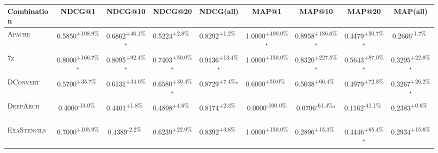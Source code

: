 \begin{table}[htbp]
\centering
\renewcommand{\arraystretch}{1.2}
\begin{tabular}{l|cccc|cccc}
\hline
Combination & NDCG@1 & NDCG@10 & NDCG@20 & NDCG(all) & MAP@1 & MAP@10 & MAP@20 & MAP(all) \\ \hline
\textsc{Apache} & \cellcolor{green!30}0.5850\textsuperscript{+108.9\%}$^{\,\,\,}$ & \cellcolor{green!30}0.6862\textsuperscript{+46.1\%}$^\star$ & \cellcolor{green!30}0.5224\textsuperscript{+2.8\%}$^{\,\,\,}$ & \cellcolor{green!30}0.8292\textsuperscript{+1.2\%}$^{\,\,\,}$ & \cellcolor{green!30}1.0000\textsuperscript{+400.0\%}$^\star$ & \cellcolor{green!30}0.8958\textsuperscript{+186.6\%}$^\star$ & \cellcolor{green!30}0.4479\textsuperscript{+50.7\%}$^\star$ & \cellcolor{red!30}0.2666\textsuperscript{-1.7\%}$^{\,\,\,}$ \\
\textsc{7z} & \cellcolor{green!30}0.8000\textsuperscript{+166.7\%}$^\star$ & \cellcolor{green!30}0.8095\textsuperscript{+92.4\%}$^\star$ & \cellcolor{green!30}0.7403\textsuperscript{+50.0\%}$^\star$ & \cellcolor{green!30}0.9136\textsuperscript{+13.4\%}$^\star$ & \cellcolor{green!30}1.0000\textsuperscript{+150.0\%}$^{\,\,\,}$ & \cellcolor{green!30}0.8320\textsuperscript{+227.5\%}$^\star$ & \cellcolor{green!30}0.5643\textsuperscript{+87.0\%}$^\star$ & \cellcolor{green!30}0.3295\textsuperscript{+22.8\%}$^\star$ \\
\textsc{DConvert} & \cellcolor{green!30}0.5700\textsuperscript{+35.7\%}$^{\,\,\,}$ & \cellcolor{green!30}0.6131\textsuperscript{+34.0\%}$^{\,\,\,}$ & \cellcolor{green!30}0.6580\textsuperscript{+30.4\%}$^\star$ & \cellcolor{green!30}0.8729\textsuperscript{+7.4\%}$^\star$ & \cellcolor{green!30}0.6000\textsuperscript{+50.0\%}$^{\,\,\,}$ & \cellcolor{green!30}0.5038\textsuperscript{+66.4\%}$^{\,\,\,}$ & \cellcolor{green!30}0.4979\textsuperscript{+72.8\%}$^{\,\,\,}$ & \cellcolor{green!30}0.3267\textsuperscript{+26.2\%}$^\star$ \\
\textsc{DeepArch} & \cellcolor{red!30}0.4000\textsuperscript{-13.0\%}$^{\,\,\,}$ & \cellcolor{green!30}0.4401\textsuperscript{+1.8\%}$^{\,\,\,}$ & \cellcolor{green!30}0.4898\textsuperscript{+4.6\%}$^{\,\,\,}$ & \cellcolor{green!30}0.8174\textsuperscript{+2.3\%}$^{\,\,\,}$ & \cellcolor{red!30}0.0000\textsuperscript{-100.0\%}$^{\,\,\,}$ & \cellcolor{red!30}0.0796\textsuperscript{-61.4\%}$^\star$ & \cellcolor{red!30}0.1162\textsuperscript{-41.1\%}$^{\,\,\,}$ & \cellcolor{green!30}0.2383\textsuperscript{+0.6\%}$^{\,\,\,}$ \\
\textsc{ExaStencils} & \cellcolor{green!30}0.7000\textsuperscript{+105.9\%}$^{\,\,\,}$ & \cellcolor{red!30}0.4389\textsuperscript{-2.2\%}$^{\,\,\,}$ & \cellcolor{green!30}0.6239\textsuperscript{+22.9\%}$^{\,\,\,}$ & \cellcolor{green!30}0.8392\textsuperscript{+3.8\%}$^{\,\,\,}$ & \cellcolor{green!30}1.0000\textsuperscript{+150.0\%}$^{\,\,\,}$ & \cellcolor{green!30}0.2896\textsuperscript{+15.3\%}$^{\,\,\,}$ & \cellcolor{green!30}0.4446\textsuperscript{+65.4\%}$^\star$ & \cellcolor{green!30}0.2934\textsuperscript{+15.6\%}$^{\,\,\,}$ \\

\end{tabular}
\end{table}
